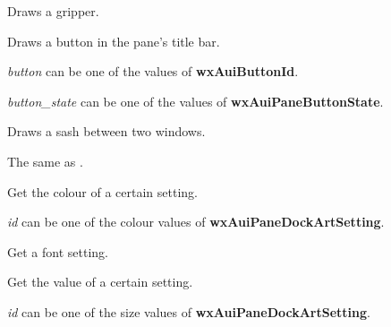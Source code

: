 
Draws a gripper.

\label{wxauidockartdrawpanebutton}


Draws a button in the pane's title bar.

{\it button} can be one of the values of {\bf wxAuiButtonId}.

{\it button\_state} can be one of the values of {\bf wxAuiPaneButtonState}.

\label{wxauidockartdrawsash}


Draws a sash between two windows.

\label{wxauidockartgetcolor}


The same as .

\label{wxauidockartgetcolour}


Get the colour of a certain setting.

{\it id} can be one of the colour values of {\bf wxAuiPaneDockArtSetting}.


\label{wxauidockartgetfont}


Get a font setting.

\label{wxauidockartgetmetric}


Get the value of a certain setting.

{\it id} can be one of the size values of {\bf wxAuiPaneDockArtSetting}.


